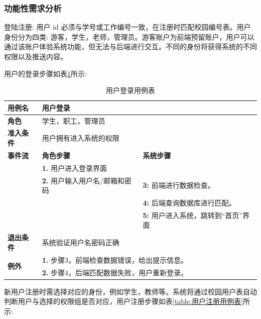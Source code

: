 \subsubsection{功能性需求分析}

登陆注册: 用户 id 必须与学号或工作编号一致，在注册时匹配校园编号表。用户身份分为四类: 游客，学生，老师，管理员。游客账户为前端预留账户，用户可以通过该账户体验系统功能，但无法与后端进行交互。不同的身份将获得系统的不同权限以及推送内容。

用户的登录步骤如表\ref{table:用户登录用例表}所示:

\begin{table}[H]
  \centering
  \renewcommand\arraystretch{1.1}
  \small
  \caption{用户登录用例表}
  \label{table:用户登录用例表}
  \setlength{\tabcolsep}{4mm}
  \begin{tabular}{|p{2cm}|p{5.75cm}|p{5.75cm}|}
    \hline \textbf{用例名} & \multicolumn{2}{l|}{用户登录} \\
    \hline \textbf{角色} & \multicolumn{2}{l|}{学生，职工，管理员} \\
    \hline \textbf{准入条件} & \multicolumn{2}{l|}{用户拥有进入系统的权限} \\
    \hline \textbf{事件流} & \textbf{角色步骤} & \textbf{系统步骤} \\
    \hline \multirow{3}{*}{~} & \textbf{1.} 用户进入登录界面  &    \\
    \cline{2-3} & \textbf{2.} 用户输入用户名/邮箱和密码 & \textbf{3:} 前端进行数据检查。 \\
    \cline{2-3} &  & \textbf{4:} 后端查询数据库进行匹配。 \\
    \cline{2-3} &  & \textbf{5:} 用户进入系统，跳转到``首页''界面 \\
    \hline \textbf{退出条件}  & \multicolumn{2}{l|}{系统验证用户名密码正确} \\
    \hline \multirow{2}{*}{\textbf{例外}} & \multicolumn{2}{l|}{\textbf{1.} 步骤3，前端检查数据错误，给出提示信息。} \\
     & \multicolumn{2}{l|}{\textbf{2.} 步骤4，后端匹配数据失败，用户重新登录。} \\
    \hline
  \end{tabular}
\end{table}

新用户注册时需选择对应的身份，例如学生，教师等。系统将通过校园用户表自动判断用户与选择的权限组是否对应，用户注册步骤如表\ref{table:用户注册用例表}所示:

